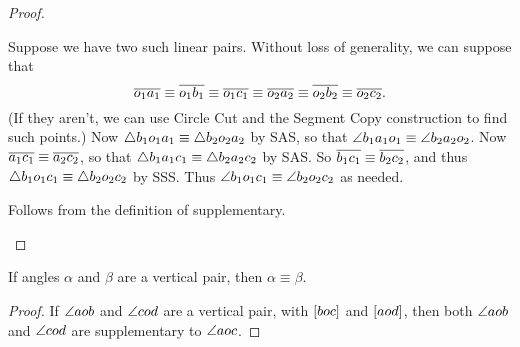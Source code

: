 \begin{proof}\mbox{}
\begin{proplist}
\item Suppose we have two such linear pairs.
Without loss of generality, we can suppose that \[ \overline{o_1a_1} \equiv \overline{o_1b_1} \equiv \overline{o_1c_1} \equiv \overline{o_2a_2} \equiv \overline{o_2b_2} \equiv \overline{o_2c_2}. \] (If they aren't, we can use Circle Cut and the Segment Copy construction to find such points.) Now \(\bigtriangleup{b_1o_1a_1} \equiv \bigtriangleup{b_2o_2a_2}\) by SAS, so that \(\angle{b_1a_1o_1} \equiv \angle{b_2a_2o_2}\).
Now \(\overline{a_1c_1} \equiv \overline{a_2c_2}\), so that \(\bigtriangleup{b_1a_1c_1} \equiv \bigtriangleup{b_2a_2c_2}\) by SAS.
So \(\overline{b_1c_1} \equiv \overline{b_2c_2}\), and thus \(\bigtriangleup{b_1o_1c_1} \equiv \bigtriangleup{b_2o_2c_2}\) by SSS.
Thus \(\angle{b_1o_1c_1} \equiv \angle{b_2o_2c_2}\) as needed.

\item Follows from the definition of supplementary.
\qedhere
\end{proplist}
\end{proof}

\begin{cor}
If angles \(\alpha\) and \(\beta\) are a vertical pair, then \(\alpha \equiv \beta\).
\end{cor}

\begin{proof}
If \(\angle{aob}\) and \(\angle{cod}\) are a vertical pair, with \([ b o c ]\) and \([ a o d ]\), then both \(\angle{aob}\) and \(\angle{cod}\) are supplementary to \(\angle{aoc}\).
\end{proof}


